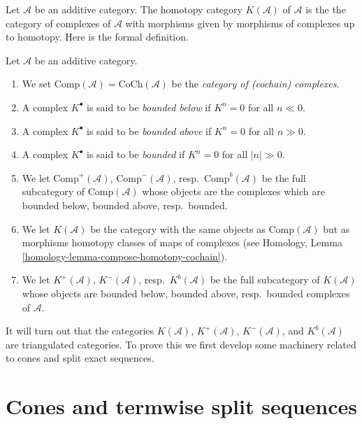 \noindent
Let $\mathcal{A}$ be an additive category. The homotopy category
$K(\mathcal{A})$ of $\mathcal{A}$ is the the category of complexes of
$\mathcal{A}$ with morphisms given by morphisms of complexes up to homotopy.
Here is the formal definition.

\begin{definition}
\label{definition-complexes-notation}
Let $\mathcal{A}$ be an additive category.
\begin{enumerate}
\item We set $\text{Comp}(\mathcal{A}) = \text{CoCh}(\mathcal{A})$
be the {\it category of (cochain) complexes}.
\item A complex $K^\bullet$ is said to be
{\it bounded below} if $K^n = 0$ for all $n \ll 0$.
\item A complex $K^\bullet$ is said to be
{\it bounded above} if $K^n = 0$ for all $n \gg 0$.
\item A complex $K^\bullet$ is said to be
{\it bounded} if $K^n = 0$ for all $|n| \gg 0$.
\item We let
$\text{Comp}^{+}(\mathcal{A})$, $\text{Comp}^{-}(\mathcal{A})$,
resp.\ $\text{Comp}^b(\mathcal{A})$ be the full subcategory
of $\text{Comp}(\mathcal{A})$ whose objects are the complexes
which are bounded below, bounded above, resp.\ bounded.
\item We let $K(\mathcal{A})$ be the category with the same objects
as $\text{Comp}(\mathcal{A})$ but as morphisms homotopy classes of
maps of complexes (see
Homology, Lemma \ref{homology-lemma-compose-homotopy-cochain}).
\item We let $K^{+}(\mathcal{A})$, $K^{-}(\mathcal{A})$,
resp.\ $K^b(\mathcal{A})$ be the full subcategory of $K(\mathcal{A})$
whose objects are bounded below, bounded above, resp.\ bounded
complexes of $\mathcal{A}$.
\end{enumerate}
\end{definition}

\noindent
It will turn out that the categories $K(\mathcal{A})$,
$K^{+}(\mathcal{A})$, $K^{-}(\mathcal{A})$, and $K^b(\mathcal{A})$
are triangulated categories. To prove this we first develop
some machinery related to cones and split exact sequences.




\section{Cones and termwise split sequences}
\label{section-cones}

